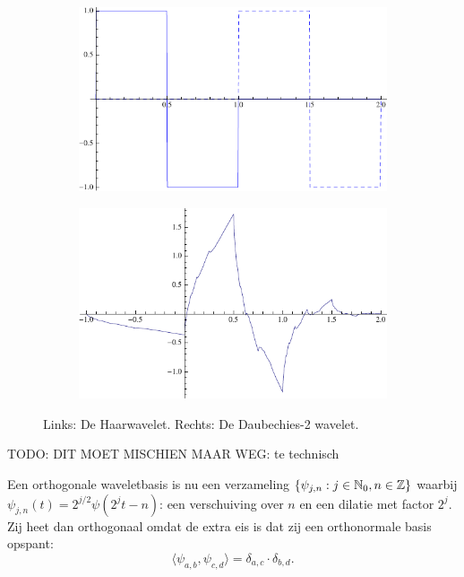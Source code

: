 \begin{figure}[h]
  \centering
  \begin{subfigure}{0.48\linewidth}
    \includegraphics[width=\linewidth]{plaatjes/db1.pdf}
  \end{subfigure}
  \begin{subfigure}{0.48\linewidth}
    \includegraphics[width=\linewidth]{plaatjes/db2_psi.pdf}
  \end{subfigure}
  \caption{Links: De Haarwavelet. Rechts: De Daubechies-2 wavelet.}
\label{fig:samenv}
\end{figure}

TODO: DIT MOET MISCHIEN MAAR WEG: te technisch

Een orthogonale waveletbasis is nu een verzameling $\{ \psi_{j,n}: j \in \mathbb{N}_0, n \in \mathbb{Z} \}$ waarbij $\psi_{j,n}(t) = 2^{j/2} \psi(2^jt - n)$: een verschuiving over $n$ en een dilatie met factor $2^j$. Zij heet dan orthogonaal omdat de extra eis is dat zij een orthonormale basis opspant: \[\langle \psi_{a,b}, \psi_{c,d} \rangle = \delta_{a,c} \cdot \delta_{b,d}.\]

